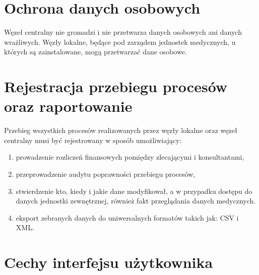 \documentclass[a4paper]{report}
\begin{document}
\section{Ochrona danych osobowych}

Węzeł centralny nie gromadzi i nie przetwarza danych osobowych ani danych wrażliwych. Węzły lokalne, będące pod zarządem jednostek medycznych, u których są zainstalowane, mogą przetwarzać dane osobowe.

\section{Rejestracja przebiegu procesów oraz raportowanie}

Przebieg wszystkich procesów realizowanych przez węzły lokalne oraz węzeł 
centralny musi być rejestrowany w sposób umożliwiający: 
\begin{enumerate}
  \item prowadzenie rozliczeń finansowych pomiędzy zlecającymi i konsultantami,
  \item przeprowadzenie audytu poprawności przebiegu procesów,
  \item stwierdzenie kto, kiedy i jakie dane modyfikował, a w przypadku dostępu do danych
  jednostki zewnętrznej, również fakt przeglądania danych medycznych.
  \item eksport zebranych danych do uniwersalnych formatów takich jak: CSV i XML.
\end{enumerate}

\section{Cechy interfejsu użytkownika}
\end{document}
